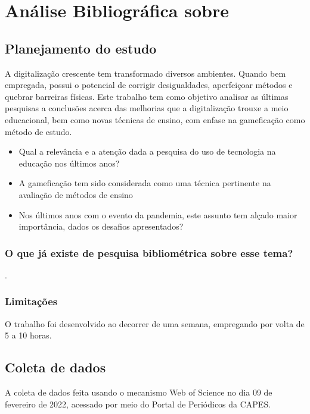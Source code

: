 \chapter{Análise Bibliográfica sobre \label{chap:bibliometria:}}

\section{Planejamento do estudo\label{}}

  A digitalização crescente tem transformado diversos ambientes. Quando bem empregada, possui o potencial de corrigir desigualdades, aperfeiçoar métodos e quebrar barreiras físicas. Este trabalho tem como objetivo analisar as últimas pesquisas a conclusões acerca das melhorias que a digitalização trouxe a meio educacional, bem como novas técnicas de ensino, com enfase na gameficação como método de estudo.
 

\begin{itemize}
    \item Qual a relevância e a atenção dada a pesquisa do uso de tecnologia na educação nos últimos anos?
    \item A gameficação tem sido considerada como uma técnica pertinente na avaliação de métodos de ensino
    \item Nos últimos anos com o evento da pandemia, este assunto tem alçado maior importância, dados os desafios apresentados?
\end{itemize}

\subsection{O que já existe de pesquisa bibliométrica sobre esse tema?}

\cite{} 
\cite{}.


\subsection{Limitações} O trabalho foi desenvolvido ao decorrer de uma semana, empregando por volta de 5 a 10 horas.

\section{Coleta de dados\label{}}

A coleta de dados feita usando o mecanismo Web of Science no dia 09 de fevereiro de 2022, acessado por meio do Portal de Periódicos da CAPES.


